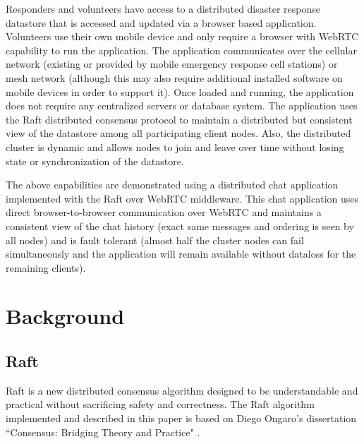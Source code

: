 \documentclass[conference,compsoc]{./IEEEtran/IEEEtran}
\begin{document}
Responders and volunteers have access to a distributed disaster response datastore that is accessed and updated via a browser based application. Volunteers use their own mobile device and only require a browser with WebRTC capability to run the application. The application communicates over the cellular network (existing or provided by mobile emergency response cell stations) or mesh network (although this may also require additional installed software on mobile devices in order to support it). Once loaded and running, the application does not require any centralized servers or database system. The application uses the Raft distributed consensus protocol to maintain a distributed but consistent view of the datastore among all participating client nodes. Also, the distributed cluster is dynamic and allows nodes to join and leave over time without losing state or synchronization of the datastore.

The above capabilities are demonstrated using a distributed chat application implemented with the Raft over WebRTC middleware. This chat application uses direct browser-to-browser communication over WebRTC and maintains a consistent view of the chat history (exact same messages and ordering is seen by all nodes) and is fault tolerant (almost half the cluster nodes can fail simultaneously and the application will remain available without dataloss for the remaining clients).

\section{Background}

\subsection{Raft}

Raft is a new distributed consensus algorithm designed to be understandable and practical without sacrificing safety and correctness. The Raft algorithm implemented and described in this paper is based on Diego Ongaro's dissertation ``Consensus: Bridging Theory and Practice" \cite{raft_thesis:ongaro14}.
\end{document}
